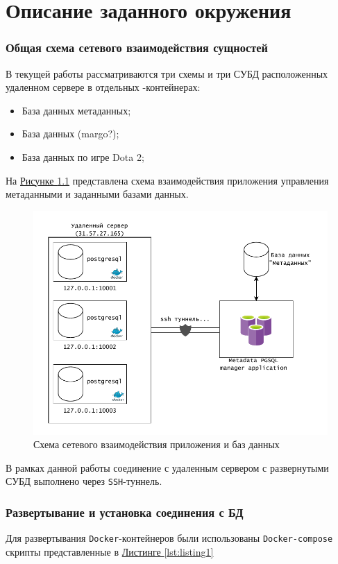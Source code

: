 \chapter{Описание заданного окружения}
\subsection*{Общая схема сетевого взаимодействия сущностей}
В текущей работы рассматриваются три схемы и три СУБД расположенных удаленном сервере в отдельных -контейнерах:
\begin{itemize}
	\item База данных метаданных;
	\item База данных (margo?);
	\item База данных по игре Dota 2;
\end{itemize}

На \hyperref[fig:general-schema]{Рисунке \ref*{fig:general-schema}} представлена схема взаимодействия приложения управления метаданными и заданными базами данных.
\begin{figure}[h!]
	\centering
	\includegraphics[width=1\linewidth]{docker-general-schema.drawio.pdf}
	\caption{Схема сетевого взаимодействия приложения и баз данных}
	\label{fig:general-schema}
\end{figure}

В рамках данной работы соединение с удаленным сервером с развернутыми СУБД выполнено через \texttt{SSH}-туннель.

\subsection*{Развертывание и установка соединения с БД}
Для развертывания \texttt{Docker}-контейнеров были использованы \texttt{Docker-compose} скрипты представленные в \hyperref[lst:listing1]{Листинге \ref*{lst:listing1}}

